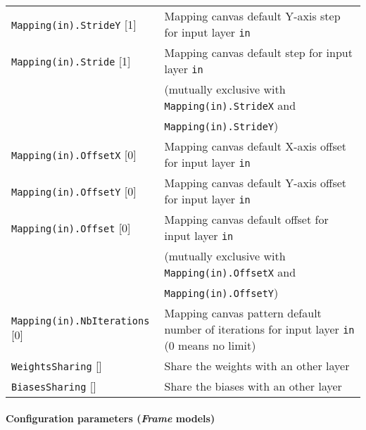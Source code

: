 \documentclass[a4paper,11pt,oneside]{article}
\begin{document}
\begin{center}
\begin{longtable}{| p{5cm} | p{10cm} | }
  \lstinline!Mapping(in).StrideY! [1] & Mapping canvas default Y-axis step
  for input layer \lstinline!in! \\
  \lstinline!Mapping(in).Stride! [1] & Mapping canvas default step
  for input layer \lstinline!in! \\
   & (mutually exclusive with \lstinline!Mapping(in).StrideX! and \\
   & \lstinline!Mapping(in).StrideY!) \\
  \lstinline!Mapping(in).OffsetX! [0] & Mapping canvas default X-axis offset
  for input layer \lstinline!in! \\
  \lstinline!Mapping(in).OffsetY! [0] & Mapping canvas default Y-axis offset
  for input layer \lstinline!in! \\
  \lstinline!Mapping(in).Offset! [0] & Mapping canvas default offset
  for input layer \lstinline!in! \\
   & (mutually exclusive with \lstinline!Mapping(in).OffsetX! and \\
   & \lstinline!Mapping(in).OffsetY!) \\
  \lstinline!Mapping(in).NbIterations! [0] & Mapping canvas pattern default
  number of iterations for input layer \lstinline!in! (0 means no limit) \\
  \lstinline!WeightsSharing! [] & Share the weights with an other layer \\
  \lstinline!BiasesSharing! [] & Share the biases with an other layer \\
 \hline
\end{longtable}
\end{center}

\paragraph{Configuration parameters (\emph{Frame} models)}
\end{document}
